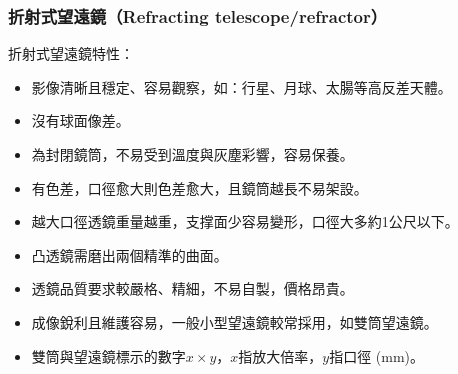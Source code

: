 \documentclass[a4paper,12pt]{report}
\begin{document}
\subsubsection{折射式望遠鏡（Refracting telescope/refractor）}
\bctf{}\efct
折射式望遠鏡特性：
\begin{itemize}
\item 影像清晰且穩定、容易觀察，如：行星、月球、太腸等高反差天體。
\item 沒有球面像差。
\item 為封閉鏡筒，不易受到溫度與灰塵彩響，容易保養。
\item 有色差，口徑愈大則色差愈大，且鏡筒越長不易架設。
\item 越大口徑透鏡重量越重，支撑面少容易變形，口徑大多約1公尺以下。
\item 凸透鏡需磨出兩個精準的曲面。
\item 透鏡品質要求較嚴格、精細，不易自製，價格昂貴。
\item 成像銳利且維護容易，一般小型望遠鏡較常採用，如雙筒望遠鏡。
\item 雙筒與望遠鏡標示的數字$x\times y$，$x$指放大倍率，$y$指口徑 (mm)。
\end{itemize}
\end{document}
